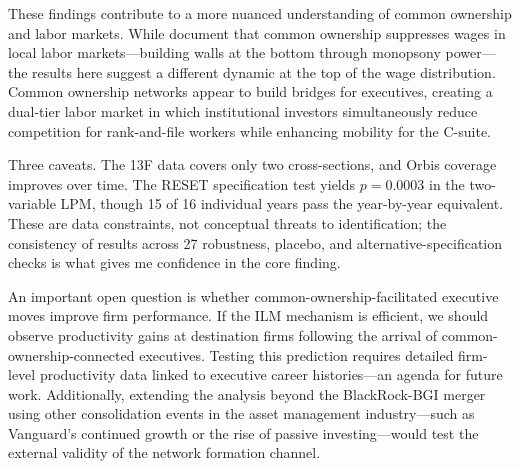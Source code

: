 \documentclass[11pt,a4paper]{article}
\begin{document}
These findings contribute to a more nuanced understanding of common ownership and labor markets. While \cite{azar2022} document that common ownership suppresses wages in local labor markets---building walls at the bottom through monopsony power---the results here suggest a different dynamic at the top of the wage distribution. Common ownership networks appear to build bridges for executives, creating a dual-tier labor market in which institutional investors simultaneously reduce competition for rank-and-file workers while enhancing mobility for the C-suite.

Three caveats. The 13F data covers only two cross-sections, and Orbis coverage improves over time. The RESET specification test yields $p=0.0003$ in the two-variable LPM, though 15 of 16 individual years pass the year-by-year equivalent. These are data constraints, not conceptual threats to identification; the consistency of results across 27 robustness, placebo, and alternative-specification checks is what gives me confidence in the core finding.

An important open question is whether common-ownership-facilitated executive moves improve firm performance. If the ILM mechanism is efficient, we should observe productivity gains at destination firms following the arrival of common-ownership-connected executives. Testing this prediction requires detailed firm-level productivity data linked to executive career histories---an agenda for future work. Additionally, extending the analysis beyond the BlackRock-BGI merger using other consolidation events in the asset management industry---such as Vanguard's continued growth or the rise of passive investing---would test the external validity of the network formation channel.

\newpage
\end{document}
